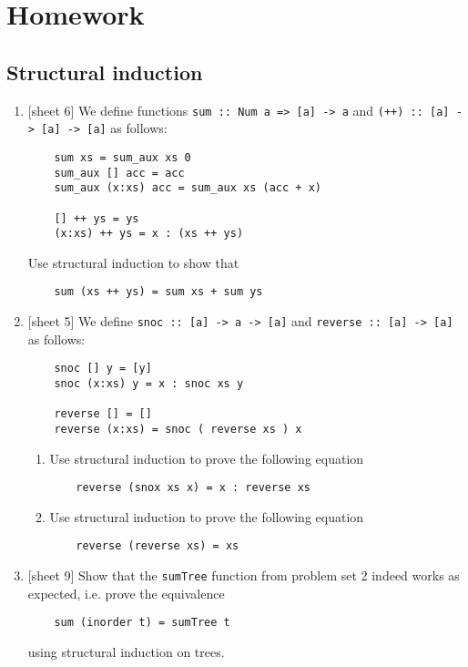\documentclass{article}
\def\code#1{\texttt{#1}}
\begin{document}
\section{Homework}

\subsection{Structural induction}
\begin{enumerate}
    \item {[sheet 6]} We define functions \code{sum :: Num a => [a] -> a} and \code{(++) :: [a] -> [a] -> [a]} as follows:
        \begin{verbatim}
    sum xs = sum_aux xs 0
    sum_aux [] acc = acc
    sum_aux (x:xs) acc = sum_aux xs (acc + x)

    [] ++ ys = ys
    (x:xs) ++ ys = x : (xs ++ ys)
        \end{verbatim}
        Use structural induction to show that
        \begin{verbatim}
    sum (xs ++ ys) = sum xs + sum ys
        \end{verbatim}

    \item {[sheet 5]} We define \code{snoc :: [a] -> a -> [a]} and \code{reverse :: [a] -> [a]} as follows:
        \begin{verbatim}
    snoc [] y = [y]
    snoc (x:xs) y = x : snoc xs y

    reverse [] = []
    reverse (x:xs) = snoc ( reverse xs ) x
        \end{verbatim}
        \begin{enumerate}
            \item Use structural induction to prove the following equation
                \begin{verbatim}
    reverse (snox xs x) = x : reverse xs
                \end{verbatim}
            \item Use structural induction to prove the following equation
                \begin{verbatim}
    reverse (reverse xs) = xs
                \end{verbatim}
        \end{enumerate}

    \item {[sheet 9]} Show that the \code{sumTree} function from problem set 2 indeed works as expected, i.e. prove the equivalence
        \begin{verbatim}
    sum (inorder t) = sumTree t
        \end{verbatim}
        using structural induction on trees.
\end{enumerate}
\end{document}
